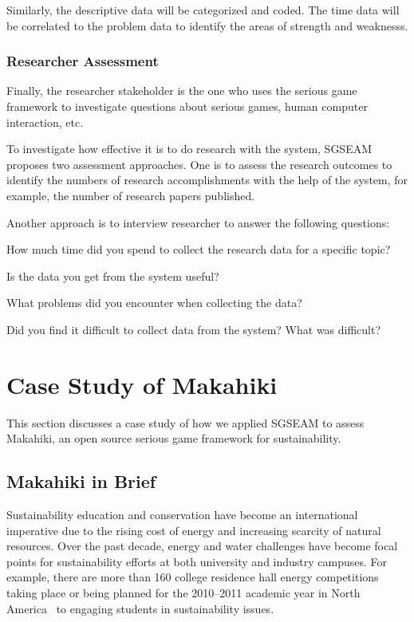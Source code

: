 \documentclass{sigchi}
\begin{document}
Similarly, the descriptive data will be categorized and coded. The time data will be correlated to the problem data to identify the areas of strength and weaknesss.

\subsubsection{Researcher Assessment}

Finally, the researcher stakeholder is the one who uses the serious game framework to
investigate questions about serious games, human computer interaction, etc.

To investigate how effective it is to do research with the system, SGSEAM proposes two assessment
approaches. One is to assess the research outcomes to identify the numbers of research
accomplishments with the help of the system, for example, the number of research papers published.

Another approach is to interview researcher to answer the following questions:
\begin{compactitem}
\item How much time did you spend to collect the research data for a
  specific topic?
\item Is the data you get from the system useful?
\item What problems did you encounter when collecting the data?
\item Did you find it difficult to collect data from the system?
  What was difficult?
\end{compactitem}

\section{Case Study of Makahiki}

This section discusses a case study of how we applied SGSEAM to assess Makahiki, an open source serious
game framework for sustainability. 

\subsection{Makahiki in Brief}

Sustainability education and conservation have become an international imperative due to the
rising cost of energy and increasing scarcity of natural resources. Over the past decade, energy
and water challenges have become focal points for sustainability efforts at both university and
industry campuses. For example, there are more than 160 college residence hall energy
competitions taking place or being planned for the 2010--2011 academic year in North America~\cite{Hodge2010} to engaging students in sustainability issues.
\end{document}

